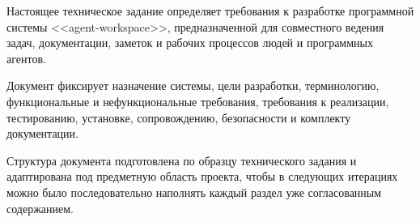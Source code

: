 
Настоящее техническое задание определяет требования к разработке программной системы <<agent-workspace>>, предназначенной для совместного ведения задач, документации, заметок и рабочих процессов людей и программных агентов.

Документ фиксирует назначение системы, цели разработки, терминологию, функциональные и нефункциональные требования, требования к реализации, тестированию, установке, сопровождению, безопасности и комплекту документации.

Структура документа подготовлена по образцу технического задания и адаптирована под предметную область проекта, чтобы в следующих итерациях можно было последовательно наполнять каждый раздел уже согласованным содержанием.
